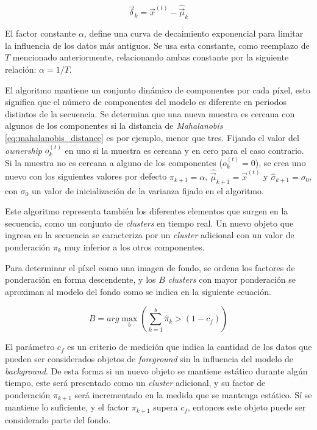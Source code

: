 \[
\vec{\delta}_k = \vec{x}^{(t)} - \hat{\vec{\mu}}_k
\]


El factor constante $\alpha$, define una curva de decaimiento exponencial para limitar la influencia de los datos más antiguos. Se usa esta constante, como reemplazo de $T$ mencionado anteriormente, relacionando ambas constante por la siguiente relación: $\alpha=1/T$. 

El algoritmo mantiene un conjunto dinámico de componentes por cada píxel, esto significa que el número de componentes del modelo es diferente en periodos distintos de la secuencia. Se determina que una nueva muestra es cercana con algunos de los componentes si la distancia de \textit{Mahalanobis} \eqref{eq:mahalanobis_distance} es por ejemplo, menor que tres. Fijando el valor del \textit{ownership} $o^{(t)}_k$ en uno si la muestra es cercana y en cero para el caso contrario. Si la muestra no es cercana a alguno de los componentes ($o^{(t)}_k=0$), se crea uno nuevo con los siguientes valores por defecto $\pi_{k+1} = \alpha$, $\hat{\vec{\mu}}_{k+1}=\vec{x}^{(t)}$ y $\hat{\sigma}_{k+1}=\sigma_0$, con $\sigma_0$ un valor de inicialización de la varianza fijado en el algoritmo.

Este algoritmo representa también los diferentes elementos que surgen en la secuencia, como un conjunto de \textit{clusters} en tiempo real. Un nuevo objeto que ingresa en la secuencia se caracteriza por un \textit{cluster} adicional con un valor de ponderación $\pi_k$ muy inferior a los otros componentes. 

Para determinar el píxel como una imagen de fondo, se ordena los factores de ponderación en forma descendente, y los $B$ \textit{clusters} con mayor ponderación se aproximan al modelo del fondo como se indica en la siguiente ecuación.

\begin{equation} \label{eq:clusters}
B=arg \max_{b}  (\sum_{k=1}^{b} \hat{\pi}_k > (1 - c_f))
\end{equation}

El parámetro $c_f$ es un criterio de medición que indica la cantidad de los datos que pueden ser considerados objetos de \textit{foreground} sin la influencia del modelo de \textit{background}. De esta forma si un nuevo objeto se mantiene estático durante algún tiempo, este será presentado como un \textit{cluster} adicional, y su factor de ponderación $\pi_{k+1}$ será incrementado en la medida que se mantenga estático. Sí se mantiene lo suficiente, y el factor $\pi_{k+1}$ supera $c_f$, entonces este objeto puede ser considerado parte del fondo.


